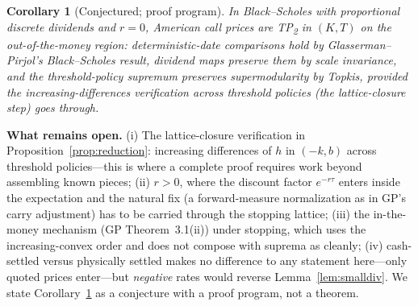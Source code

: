 \documentclass[11pt]{article}
\newtheorem{corollary}{Corollary}
\theoremstyle{remark}
\begin{document}
\begin{corollary}[Conjectured; proof program]\label{cor:bsdiv}
In Black--Scholes with proportional discrete dividends and $r=0$, American call prices are TP\textsubscript{2} in $(K,T)$ on the out-of-the-money region: deterministic-date comparisons hold by Glasserman--Pirjol's Black--Scholes result, dividend maps preserve them by scale invariance, and the threshold-policy supremum preserves supermodularity by Topkis, \emph{provided} the increasing-differences verification across threshold policies (the lattice-closure step) goes through.
\end{corollary}

\noindent\textbf{What remains open.} (i) The lattice-closure verification in Proposition~\ref{prop:reduction}: increasing differences of $h$ in $(-k,b)$ across threshold policies---this is where a complete proof requires work beyond assembling known pieces; (ii) $r>0$, where the discount factor $e^{-r\tau}$ enters inside the expectation and the natural fix (a forward-measure normalization as in GP's carry adjustment) has to be carried through the stopping lattice; (iii) the in-the-money mechanism (GP Theorem~3.1(ii)) under stopping, which uses the increasing-convex order and does not compose with suprema as cleanly; (iv) cash-settled versus physically settled makes no difference to any statement here---only quoted prices enter---but \emph{negative} rates would reverse Lemma~\ref{lem:smalldiv}. We state Corollary~\ref{cor:bsdiv} as a conjecture with a proof program, not a theorem.
\end{document}

